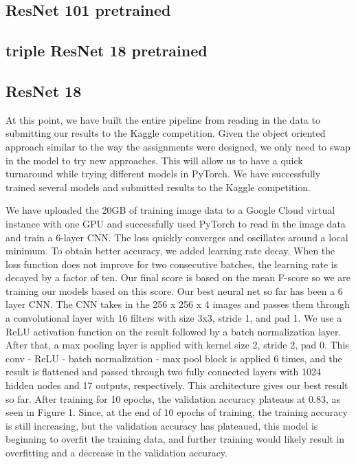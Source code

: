 \documentclass[10pt,twocolumn,letterpaper]{article}
\begin{document}
\subsection*{ResNet 101 pretrained}
\subsection*{triple ResNet 18 pretrained}
\subsection*{ResNet 18}
At this point, we have built the entire pipeline from reading in the data to submitting our results to the Kaggle competition. Given the object oriented approach similar to the way the assignments were designed, we only need to swap in the model to try new approaches. This will allow us to have a quick turnaround while trying different models in PyTorch. We have successfully trained several models and submitted results to the Kaggle competition.

We have uploaded the 20GB of training image data to a Google Cloud virtual instance with one GPU and successfully used PyTorch to read in the image data and train a 6-layer CNN. The loss quickly converges and oscillates around a local minimum. To obtain better accuracy, we added learning rate decay. When the loss function does not improve for two consecutive batches, the learning rate is decayed by a factor of ten. Our final score is based on the mean F-score so we are training our models based on this score. Our best neural net so far has been a 6 layer CNN. The CNN takes in the 256 x 256 x 4 images and passes them through a convolutional layer with 16 filters with size 3x3, stride 1, and pad 1. We use a ReLU activation function on the result followed by a batch normalization layer. After that, a max pooling layer is applied with kernel size 2, stride 2, pad 0. This conv - ReLU - batch normalization - max pool block is applied 6 times, and the result is flattened and passed through two fully connected layers with 1024 hidden nodes and 17 outputs, respectively. This architecture gives our best result so far. After training for 10 epochs, the validation accuracy plateaus at 0.83, as seen in Figure 1. Since, at the end of 10 epochs of training, the training accuracy is still increasing, but the validation accuracy has plateaued, this model is beginning to overfit the training data, and further training would likely result in overfitting and a decrease in the validation accuracy.
\end{document}
